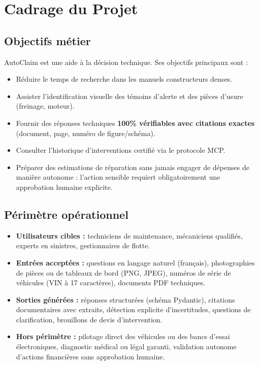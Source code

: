 \documentclass[11pt,a4paper]{article}
\begin{document}
\section{Cadrage du Projet}

\subsection{Objectifs métier}
AutoClaim est une aide à la décision technique. Ses objectifs principaux sont :
\begin{itemize}[leftmargin=*]
  \item Réduire le temps de recherche dans les manuels constructeurs denses.
  \item Assister l'identification visuelle des témoins d'alerte et des pièces d'usure (freinage, moteur).
  \item Fournir des réponses techniques \textbf{100\% vérifiables avec citations exactes} (document, page, numéro de figure/schéma).
  \item Consulter l'historique d'interventions certifié via le protocole MCP.
  \item Préparer des estimations de réparation sans jamais engager de dépenses de manière autonome : l'action sensible requiert obligatoirement une approbation humaine explicite.
\end{itemize}

\subsection{Périmètre opérationnel}
\begin{itemize}[leftmargin=*]
  \item \textbf{Utilisateurs cibles :} techniciens de maintenance, mécaniciens qualifiés, experts en sinistres, gestionnaires de flotte.
  \item \textbf{Entrées acceptées :} questions en langage naturel (français), photographies de pièces ou de tableaux de bord (PNG, JPEG), numéros de série de véhicules (VIN à 17 caractères), documents PDF techniques.
  \item \textbf{Sorties générées :} réponses structurées (schéma Pydantic), citations documentaires avec extraits, détection explicite d'incertitudes, questions de clarification, brouillons de devis d'intervention.
  \item \textbf{Hors périmètre :} pilotage direct des véhicules ou des bancs d'essai électroniques, diagnostic médical ou légal garanti, validation autonome d'actions financières sans approbation humaine.
\end{itemize}
\end{document}
